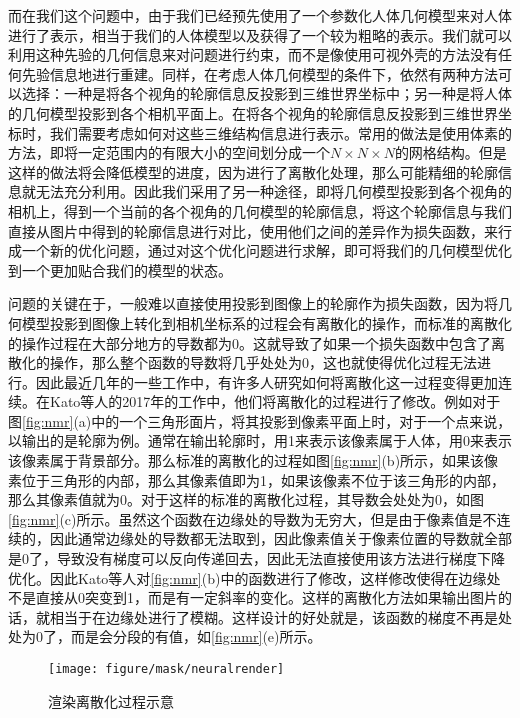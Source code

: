 而在我们这个问题中，由于我们已经预先使用了一个参数化人体几何模型来对人体进行了表示，相当于我们的人体模型以及获得了一个较为粗略的表示。我们就可以利用这种先验的几何信息来对问题进行约束，而不是像使用可视外壳的方法没有任何先验信息地进行重建。同样，在考虑人体几何模型的条件下，依然有两种方法可以选择：一种是将各个视角的轮廓信息反投影到三维世界坐标中；另一种是将人体的几何模型投影到各个相机平面上。在将各个视角的轮廓信息反投影到三维世界坐标时，我们需要考虑如何对这些三维结构信息进行表示。常用的做法是使用体素的方法，即将一定范围内的有限大小的空间划分成一个\(N\times N \times N\)的网格结构。但是这样的做法将会降低模型的进度，因为进行了离散化处理，那么可能精细的轮廓信息就无法充分利用。因此我们采用了另一种途径，即将几何模型投影到各个视角的相机上，得到一个当前的各个视角的几何模型的轮廓信息，将这个轮廓信息与我们直接从图片中得到的轮廓信息进行对比，使用他们之间的差异作为损失函数，来行成一个新的优化问题，通过对这个优化问题进行求解，即可将我们的几何模型优化到一个更加贴合我们的模型的状态。

问题的关键在于，一般难以直接使用投影到图像上的轮廓作为损失函数，因为将几何模型投影到图像上转化到相机坐标系的过程会有离散化的操作，而标准的离散化的操作过程在大部分地方的导数都为0。这就导致了如果一个损失函数中包含了离散化的操作，那么整个函数的导数将几乎处处为0，这也就使得优化过程无法进行。因此最近几年的一些工作中，有许多人研究如何将离散化这一过程变得更加连续。在Kato\cite{neuralrender}等人的2017年的工作中，他们将离散化的过程进行了修改。例如对于图\ref{fig:nmr}(a)中的一个三角形面片，将其投影到像素平面上时，对于一个点来说，以输出的是轮廓为例。通常在输出轮廓时，用1来表示该像素属于人体，用0来表示该像素属于背景部分。那么标准的离散化的过程如图\ref{fig:nmr}(b)所示，如果该像素位于三角形的内部，那么其像素值即为1，如果该像素不位于该三角形的内部，那么其像素值就为0。对于这样的标准的离散化过程，其导数会处处为0，如图\ref{fig:nmr}(c)所示。虽然这个函数在边缘处的导数为无穷大，但是由于像素值是不连续的，因此通常边缘处的导数都无法取到，因此像素值关于像素位置的导数就全部是0了，导致没有梯度可以反向传递回去，因此无法直接使用该方法进行梯度下降优化。因此Kato\cite{neuralrender}等人对\ref{fig:nmr}(b)中的函数进行了修改，这样修改使得在边缘处不是直接从0突变到1，而是有一定斜率的变化。这样的离散化方法如果输出图片的话，就相当于在边缘处进行了模糊。这样设计的好处就是，该函数的梯度不再是处处为0了，而是会分段的有值，如\ref{fig:nmr}(e)所示。 
\begin{figure}[htbp]
    \centering
    \texttt{[image: figure/mask/neuralrender]}
    \caption{\label{fig:nrm} 渲染离散化过程示意}
\end{figure}

